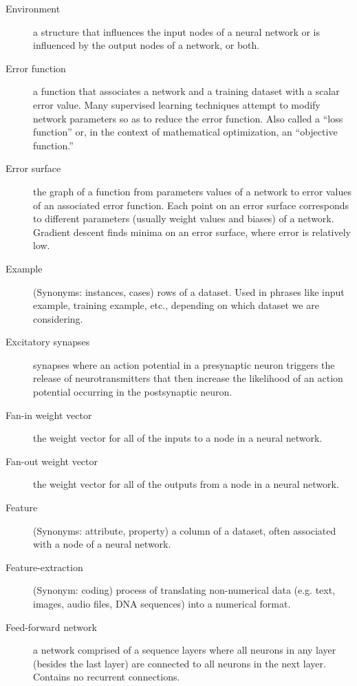 \begin{description}
\item[Environment] a structure that influences the input nodes of a neural network or is influenced by the output nodes of a network, or both.

\item[Error function] a function that associates a network and a training dataset with a scalar error value. Many supervised learning techniques attempt to modify network parameters so as to reduce the error function. Also called a ``loss function'' or, in the context of mathematical optimization, an ``objective function.''

\item[Error surface] the graph of a function from parameters values of a network to error values of an associated error function. Each point on an error surface corresponds to different parameters (usually weight values and biases) of a network. Gradient descent finds minima on an error surface, where error is relatively low.

\item[Example] (Synonyms: instances, cases) rows of a dataset. Used in phrases like input example, training example, etc., depending on which dataset we are considering.

\item[Excitatory synapses] synapses where an action potential in a presynaptic neuron triggers the release of neurotransmitters that then increase the likelihood of an action potential occurring in the postsynaptic neuron.

\item[Fan-in weight vector] the weight vector for all of the inputs to a node in a neural network.

\item[Fan-out weight vector] the weight vector for all of the outputs from a node in a neural network.

\item[Feature] (Synonyms: attribute, property) a column of a dataset, often associated with a node of a neural network.

\item[Feature-extraction] (Synonym:  coding)  process of translating non-numerical data (e.g. text, images, audio files, DNA sequences) into a numerical format. %

\item[Feed-forward network] a network comprised of a sequence layers where all neurons in any layer (besides the last layer) are connected to all neurons in the next layer. Contains no recurrent connections.


\end{description}
